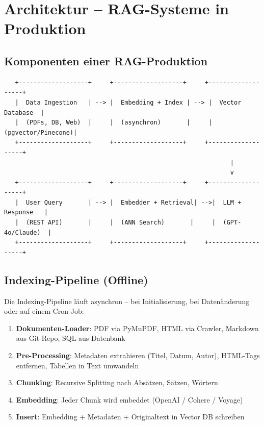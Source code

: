 \section{Architektur -- RAG-Systeme in Produktion}

\subsection{Komponenten einer RAG-Produktion}

\begin{verbatim}
   +-------------------+     +-------------------+     +-------------------+
   |  Data Ingestion   | --> |  Embedding + Index | --> |  Vector Database  |
   |  (PDFs, DB, Web)  |     |  (asynchron)       |     |  (pgvector/Pinecone)|
   +-------------------+     +-------------------+     +-------------------+
                                                              |
                                                              v
   +-------------------+     +-------------------+     +-------------------+
   |  User Query       | --> |  Embedder + Retrieval| -->|  LLM + Response   |
   |  (REST API)       |     |  (ANN Search)       |     |  (GPT-4o/Claude)  |
   +-------------------+     +-------------------+     +-------------------+
\end{verbatim}

\subsection{Indexing-Pipeline (Offline)}

Die Indexing-Pipeline läuft asynchron -- bei Initialisierung, bei Datenänderung oder auf einem Cron-Job:

\begin{enumerate}[leftmargin=*]
    \item \textbf{Dokumenten-Loader}: PDF via PyMuPDF, HTML via Crawler, Markdown aus Git-Repo, SQL aus Datenbank
    \item \textbf{Pre-Processing}: Metadaten extrahieren (Titel, Datum, Autor), HTML-Tags entfernen, Tabellen in Text umwandeln
    \item \textbf{Chunking}: Recursive Splitting nach Absätzen, Sätzen, Wörtern
    \item \textbf{Embedding}: Jeder Chunk wird embeddet (OpenAI / Cohere / Voyage)
    \item \textbf{Insert}: Embedding + Metadaten + Originaltext in Vector DB schreiben
\end{enumerate}

